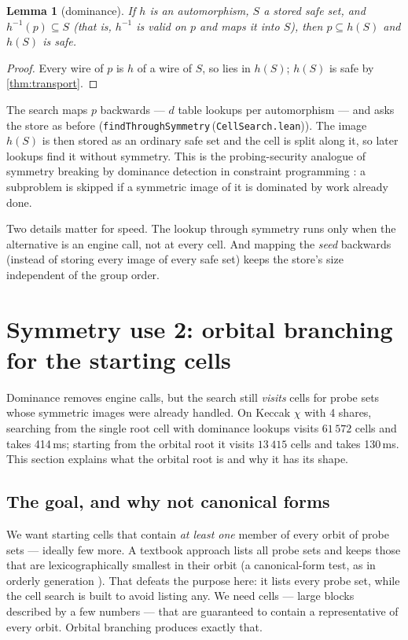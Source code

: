 \documentclass[11pt,a4paper]{article}
\newtheorem{lemma}[theorem]{Lemma}
\theoremstyle{definition}
\theoremstyle{remark}
\newcommand{\code}[1]{\texttt{\small #1}}
\newcommand{\lean}[2]{\code{#1}\,(\code{#2})}
\begin{document}
\begin{lemma}[dominance]\label{lem:dominance}
If $h$ is an automorphism, $S$ a stored safe set, and $h^{-1}(p)\subseteq S$ (that is,
$h^{-1}$ is valid on $p$ and maps it into $S$), then $p\subseteq h(S)$ and $h(S)$ is safe.
\end{lemma}
\begin{proof}
Every wire of $p$ is $h$ of a wire of $S$, so lies in $h(S)$; $h(S)$ is safe by
\cref{thm:transport}.
\end{proof}

The search maps $p$ backwards --- $d$ table lookups per automorphism --- and asks the store
as before (\lean{findThroughSymmetry}{CellSearch.lean}).  The image $h(S)$ is then stored
as an ordinary safe set and the cell is split along it, so later lookups find it without
symmetry.  This is the probing-security analogue of symmetry breaking by dominance
detection in constraint programming \cite{FahleSchambergerSellmann,FocacciMilano}: a
subproblem is skipped if a symmetric image of it is dominated by work already done.

Two details matter for speed.  The lookup through symmetry runs only when the
alternative is an engine call, not at every cell.  And mapping the \emph{seed} backwards
(instead of storing every image of every safe set) keeps the store's size independent of
the group order.

\section{Symmetry use 2: orbital branching for the starting cells}\label{sec:orbital}

Dominance removes engine calls, but the search still \emph{visits} cells for probe sets
whose symmetric images were already handled.  On Keccak $\chi$ with 4 shares, searching
from the single root cell with dominance lookups visits $61\,572$ cells and takes 414\,ms;
starting from the orbital root it visits $13\,415$ cells and takes 130\,ms.  This section
explains what the orbital root is and why it has its shape.

\subsection{The goal, and why not canonical forms}

We want starting cells that contain \emph{at least one} member of every orbit of probe
sets --- ideally few more.  A textbook approach lists all probe sets and keeps those that
are lexicographically smallest in their orbit (a canonical-form test, as in orderly
generation \cite{McKayIsomorphFree}).  That defeats the purpose here: it lists every probe
set, while the cell search is built to avoid listing any.  We need cells --- large blocks
described by a few numbers --- that are guaranteed to contain a representative of every
orbit.  Orbital branching produces exactly that.
\end{document}
